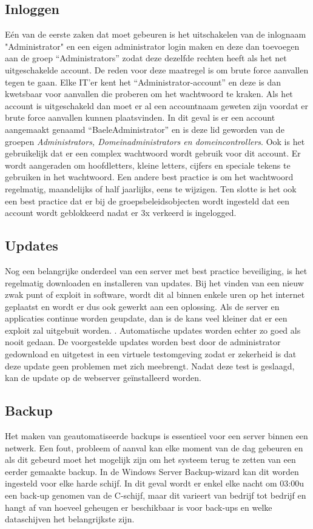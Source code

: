 \documentclass[pdftex,a4paper,12pt]{report}
\begin{document}
\subsection{Inloggen}
Eén van de eerste zaken dat moet gebeuren is het uitschakelen van de inlognaam "Administrator" en een eigen administrator login maken en deze dan toevoegen aan de groep "`Administrators"' zodat deze dezelfde rechten heeft als het net uitgeschakelde account. De reden voor deze maatregel is om brute force aanvallen tegen te gaan. Elke IT'er kent het "`Administrator-account"' en deze is dan kwetsbaar voor aanvallen die proberen om het wachtwoord te kraken. Als het account is uitgeschakeld dan moet er al een accountnaam geweten zijn voordat er brute force aanvallen kunnen plaatsvinden. In dit geval is er een account aangemaakt genaamd "`BaeleAdministrator"' en is deze lid geworden van de groepen \textit{Administrators, Domeinadministrators en domeincontrollers}. Ook is het gebruikelijk dat er een complex wachtwoord wordt gebruik voor dit account. Er wordt aangeraden om hoofdletters, kleine letters, cijfers en speciale tekens te gebruiken in het wachtwoord. Een andere best practice is om het wachtwoord regelmatig, maandelijks of half jaarlijks, eens te wijzigen. Ten slotte is het ook een best practice dat er bij de groepsbeleidsobjecten wordt ingesteld dat een account wordt geblokkeerd nadat er 3x verkeerd is ingelogged. 

\subsection{Updates}
Nog een belangrijke onderdeel van een server met best practice beveiliging, is het regelmatig downloaden en installeren van updates. Bij het vinden van een nieuw zwak punt of exploit in software, wordt dit al binnen enkele uren op het internet geplaatst en wordt er dus ook gewerkt aan een oplossing. Als de server en applicaties continue worden geupdate, dan is de kans veel kleiner dat er een exploit zal uitgebuit worden. \citep{Cott2012}. Automatische updates worden echter zo goed als nooit gedaan. De voorgestelde updates worden best door de administrator gedownload en uitgetest in een virtuele testomgeving zodat er zekerheid is dat deze update geen problemen met zich meebrengt. Nadat deze test is geslaagd, kan de update op de webserver geïnstalleerd worden.

\subsection{Backup}
Het maken van geautomatiseerde backups is essentieel voor een server binnen een netwerk. Een fout, probleem of aanval kan elke moment van de dag gebeuren en als dit gebeurd moet het mogelijk zijn om het systeem terug te zetten van een eerder gemaakte backup. In de Windows Server Backup-wizard kan dit worden ingesteld voor elke harde schijf. In dit geval wordt er enkel elke nacht om 03:00u een back-up genomen van de C-schijf, maar dit varieert van bedrijf tot bedrijf en hangt af van hoeveel geheugen er beschikbaar is voor back-ups en welke dataschijven het belangrijkste zijn. 
\end{document}
